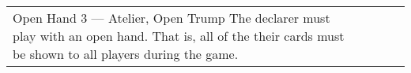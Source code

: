 \begin{table}
\begin{center}
\begin{tabularx}{\textwidth}{
			l
			S[table-number-alignment=center, table-format=1.0]
			S[table-number-alignment=center, table-format=1.0]
			p{3cm}
			|X
		}
			\specialBidItem%
			{Open Hand}
			{3}
			{{---}}
			{Atelier, Open Trump}
			{%
				The declarer must play with an open hand. That is, all of the their cards must be shown to all players during the game.
			}
		\end{tabularx}
	\end{center}
\end{table}
